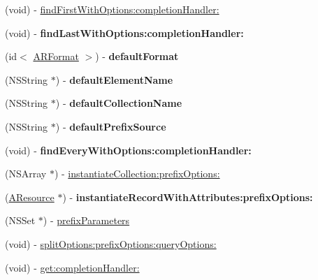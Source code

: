 \begin{DoxyCompactItemize}
\item 
(void) -\/ \hyperlink{interface_a_r_base_a72d8a5a94f38f8662ff03bb916b6f755}{find\-First\-With\-Options\-:completion\-Handler\-:}
\item 
\hypertarget{interface_a_r_base_ad44837f4604170cab4ac22abd8aa1596}{
(void) -\/ {\bfseries find\-Last\-With\-Options\-:completion\-Handler\-:}}
\label{interface_a_r_base_ad44837f4604170cab4ac22abd8aa1596}

\item 
\hypertarget{interface_a_r_base_a92af873b04ae2aadc503f5e2c7593e71}{
(id$<$ \hyperlink{protocol_a_r_format-p}{\-A\-R\-Format} $>$) -\/ {\bfseries default\-Format}}
\label{interface_a_r_base_a92af873b04ae2aadc503f5e2c7593e71}

\item 
\hypertarget{interface_a_r_base_a0b522cfe9bdb4817ec394c7904308945}{
(\-N\-S\-String $\ast$) -\/ {\bfseries default\-Element\-Name}}
\label{interface_a_r_base_a0b522cfe9bdb4817ec394c7904308945}

\item 
\hypertarget{interface_a_r_base_aa8de933ea23c92706286550e7d90b1f9}{
(\-N\-S\-String $\ast$) -\/ {\bfseries default\-Collection\-Name}}
\label{interface_a_r_base_aa8de933ea23c92706286550e7d90b1f9}

\item 
\hypertarget{interface_a_r_base_a3cbfeb0c843338934dc6cc4023e6f8f4}{
(\-N\-S\-String $\ast$) -\/ {\bfseries default\-Prefix\-Source}}
\label{interface_a_r_base_a3cbfeb0c843338934dc6cc4023e6f8f4}

\item 
\hypertarget{interface_a_r_base_a9a5229ce622944d3983fdd2ae47ccd7b}{
(void) -\/ {\bfseries find\-Every\-With\-Options\-:completion\-Handler\-:}}
\label{interface_a_r_base_a9a5229ce622944d3983fdd2ae47ccd7b}

\item 
(\-N\-S\-Array $\ast$) -\/ \hyperlink{interface_a_r_base_aaab693bcfa509ef3ddf898592c3edf01}{instantiate\-Collection\-:prefix\-Options\-:}
\item 
\hypertarget{interface_a_r_base_a106cd84052fee3936be9b0fbcd44820b}{
(\hyperlink{interface_a_resource}{\-A\-Resource} $\ast$) -\/ {\bfseries instantiate\-Record\-With\-Attributes\-:prefix\-Options\-:}}
\label{interface_a_r_base_a106cd84052fee3936be9b0fbcd44820b}

\item 
(\-N\-S\-Set $\ast$) -\/ \hyperlink{interface_a_r_base_a73105d9ed9fb6086531b2c7693ff7d27}{prefix\-Parameters}
\item 
(void) -\/ \hyperlink{interface_a_r_base_ab9ebe70524801d91eb06a260b8fbfc72}{split\-Options\-:prefix\-Options\-:query\-Options\-:}
\item 
(void) -\/ \hyperlink{interface_a_r_base_ac92f285175cda9bba386bf57f3786106}{get\-:completion\-Handler\-:}
\end{DoxyCompactItemize}
